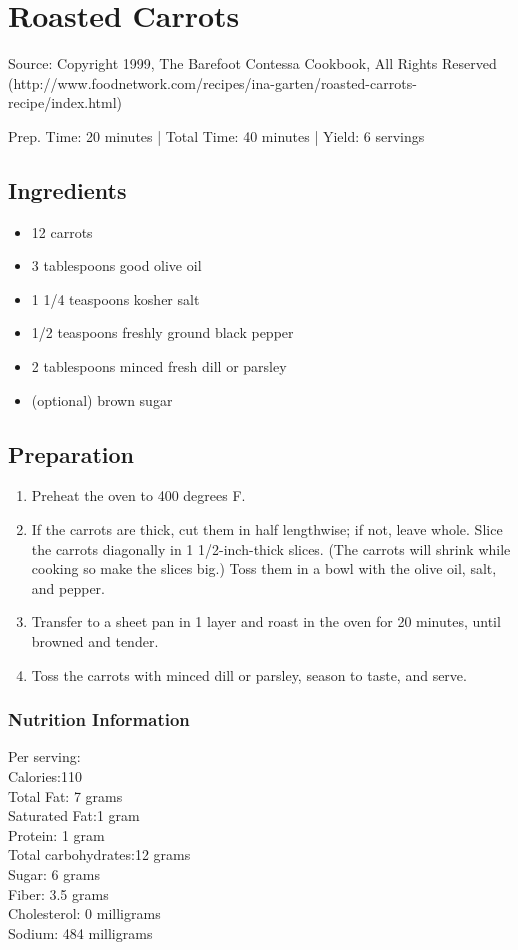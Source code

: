 \section{Roasted Carrots}

Source: Copyright 1999, The Barefoot Contessa Cookbook, All Rights Reserved (http://www.foodnetwork.com/recipes/ina-garten/roasted-carrots-recipe/index.html)

\begin{center}
Prep. Time: 20 minutes |
Total Time: 40 minutes | 
Yield: 6 servings
\end{center}

\subsection{Ingredients}
\begin{itemize}
    \item 12 carrots
    \item 3 tablespoons good olive oil
    \item 1 1/4 teaspoons kosher salt
    \item 1/2 teaspoons freshly ground black pepper
    \item 2 tablespoons minced fresh dill or parsley
    \item (optional) brown sugar
\end{itemize}

\subsection{Preparation}
\begin{enumerate}
    \item Preheat the oven to 400 degrees F.
    \item If the carrots are thick, cut them in half lengthwise; if not, leave whole. Slice the carrots diagonally in 1 1/2-inch-thick slices. (The carrots will shrink while cooking so make the slices big.) Toss them in a bowl with the olive oil, salt, and pepper.
    \item Transfer to a sheet pan in 1 layer and roast in the oven for 20 minutes, until browned and tender.
    \item Toss the carrots with minced dill or parsley, season to taste, and serve.
\end{enumerate}

\subsubsection{Nutrition Information}
Per serving:\\
Calories:110\\
Total Fat: 7 grams\\
Saturated Fat:1 gram\\
Protein: 1 gram\\
Total carbohydrates:12 grams\\
Sugar: 6 grams\\
Fiber: 3.5 grams\\
Cholesterol: 0 milligrams\\
Sodium: 484 milligrams
